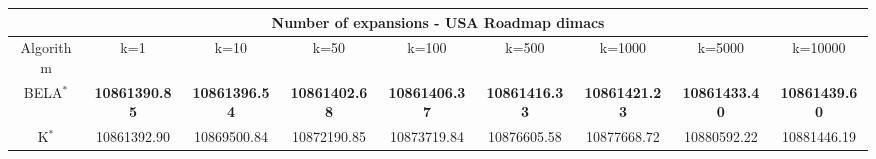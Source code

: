 \begin{tabular}{c|cccccccc}\toprule
\multicolumn{9}{c}{Number of expansions - USA Roadmap dimacs}\\ \midrule
Algorithm & k=1 & k=10 & k=50 & k=100 & k=500 & k=1000 & k=5000 & k=10000 \\ \midrule
BELA$^*$ & \textbf{10861390.85} & \textbf{10861396.54} & \textbf{10861402.68} & \textbf{10861406.37} & \textbf{10861416.33} & \textbf{10861421.23} & \textbf{10861433.40} & \textbf{10861439.60} \\
K$^*$ & 10861392.90 & 10869500.84 & 10872190.85 & 10873719.84 & 10876605.58 & 10877668.72 & 10880592.22 & 10881446.19 \\ \bottomrule 
\end{tabular}
